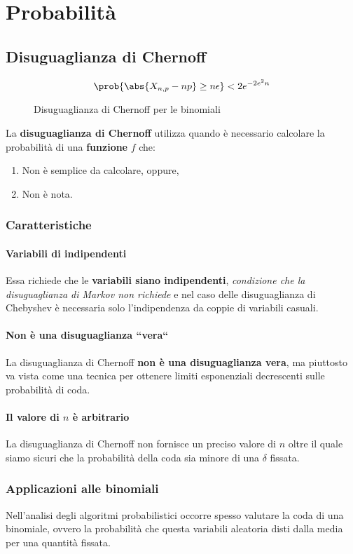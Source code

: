 \documentclass[\main/main.tex]{subfiles}
\begin{document}
\chapter{Probabilità}
\section{Disuguaglianza di Chernoff}
\begin{figure}
  \[
    \prob{\abs{X_{n,p} - np} \geq n\epsilon} < 2e^{-2e^2 n}
  \]
  \caption{Disuguaglianza di Chernoff per le binomiali}
\end{figure}
La \textbf{disuguaglianza di Chernoff} utilizza quando è necessario calcolare la probabilità di una \textbf{funzione} \(f\) che:
\begin{enumerate}
  \item Non è semplice da calcolare, oppure,
  \item Non è nota.
\end{enumerate}

\subsection{Caratteristiche}
\subsubsection{Variabili di indipendenti}
Essa richiede che le \textbf{variabili siano indipendenti}, \textit{condizione che la disuguaglianza di Markov non richiede} e nel caso delle disuguaglianza di Chebyshev è necessaria solo l'indipendenza da coppie di variabili casuali.

\subsubsection{Non è una disuguaglianza “vera“}
La disuguaglianza di Chernoff \textbf{non è una disuguaglianza vera}, ma piuttosto va vista come una tecnica per ottenere limiti esponenziali decrescenti sulle probabilità di coda.

\subsubsection{Il valore di \(n\) è arbitrario}
La disuguaglianza di Chernoff non fornisce un preciso valore di \(n\) oltre il quale siamo sicuri che la probabilità della coda sia minore di una \(\delta \) fissata.

\subsection{Applicazioni alle binomiali}
Nell'analisi degli algoritmi probabilistici occorre spesso valutare la coda di una binomiale, ovvero la probabilità che questa variabili aleatoria disti dalla media per una quantità fissata.
\end{document}
